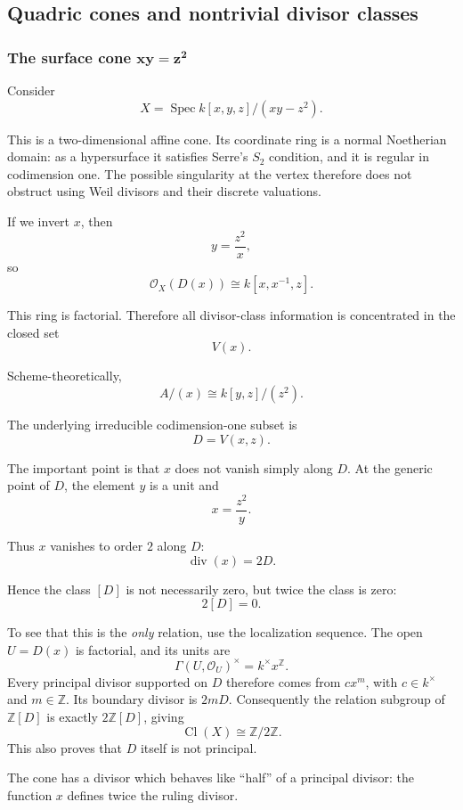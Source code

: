 \subsection{Quadric cones and nontrivial divisor classes}

\subsubsection{The surface cone \(\boldsymbol{xy=z^2}\)}

Consider
\[
X=\operatorname{Spec} k[x,y,z]/(xy-z^2).
\]

This is a two-dimensional affine cone. Its coordinate ring is a
normal Noetherian domain: as a hypersurface it satisfies
Serre's \(S_2\) condition, and it is regular in codimension one.
The possible singularity at the vertex therefore does not obstruct
using Weil divisors and their discrete valuations.

If we invert \(x\), then
\[
y=\frac{z^2}{x},
\]
so
\[
\mathcal{O}_X(D(x))
\cong
k[x,x^{-1},z].
\]

This ring is factorial. Therefore all divisor-class information is concentrated in the closed set
\[
V(x).
\]

Scheme-theoretically,
\[
A/(x)\cong k[y,z]/(z^2).
\]

The underlying irreducible codimension-one subset is
\[
D=V(x,z).
\]

The important point is that \(x\) does not vanish simply along \(D\). At the generic point of \(D\), the element \(y\) is a unit and
\[
x=\frac{z^2}{y}.
\]

Thus \(x\) vanishes to order \(2\) along \(D\):
\[
\operatorname{div}(x)=2D.
\]

Hence the class \([D]\) is not necessarily zero, but twice the class is zero:
\[
2[D]=0.
\]

To see that this is the \emph{only} relation, use the localization
sequence. The open \(U=D(x)\) is factorial, and its units are
\[
\Gamma(U,\mathcal O_U)^\times=k^\times x^{\mathbb Z}.
\]
Every principal divisor supported on \(D\) therefore comes from
\(c x^m\), with \(c\in k^\times\) and \(m\in\mathbb Z\).
Its boundary divisor is \(2mD\). Consequently the relation
subgroup of \(\mathbb Z[D]\) is exactly \(2\mathbb Z[D]\), giving
\[
\operatorname{Cl}(X)\cong\mathbb Z/2\mathbb Z.
\]
This also proves that \(D\) itself is not principal.

The cone has a divisor which behaves like ``half'' of a principal divisor: the function \(x\) defines twice the ruling divisor.

